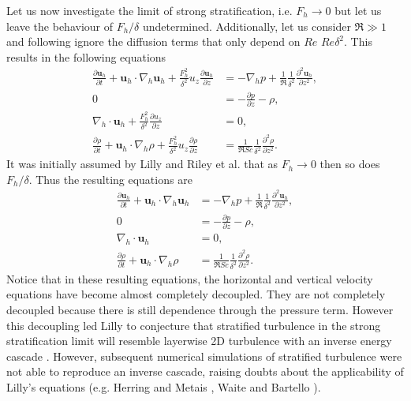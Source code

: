 Let us now investigate the limit of strong stratification, i.e. $F_{h}\rightarrow 0$ but let us leave the behaviour of $F_{h}/\delta$ undetermined. Additionally, let us consider $\Re\gg 1$ and following \cite{rileylindborg2013} ignore the diffusion terms that only depend on $Re$  $Re\delta^{2}$.  This results in the following equations 
\begin{align}
\frac{\partial \textbf{u}_{h}}{\partial t} + \textbf{u}_{h}\cdot\nabla_{h}\textbf{u}_{h}+\frac{F_{h}^{2}}{\delta^{2}}u_{z}\frac{\partial \textbf{u}_{h}}{\partial z} &= -\nabla_{h}p + \frac{1}{\Re}\frac{1}{\delta^{2}}\frac{\partial^{2}\textbf{u}_{h}}{\partial z^{2}},\\
0&= -\frac{\partial p}{\partial z} - \rho, \\
\nabla_{h}\cdot\textbf{u}_{h}+ \frac{F_{h}^{2}}{\delta^{2}}\frac{\partial u_{z}}{\partial z} &=0,\\
\frac{\partial \rho}{\partial t} + \textbf{u}_{h}\cdot\nabla_{h}\rho + \frac{F_{h}^{2}}{\delta^{2}}u_{z}\frac{\partial \rho}{\partial z} &= \frac{1}{\Re Sc}\frac{1}{\delta^{2}}\frac{\partial^{2}\rho}{\partial z^{2}} .
\end{align} 
It was initially assumed by Lilly \cite{lilly1983} and Riley et al.\cite{rileylelong2000} that as $F_{h}\rightarrow 0$ then so does $F_{h}/\delta$. Thus the resulting equations are 
\begin{align}
\frac{\partial \textbf{u}_{h}}{\partial t} + \textbf{u}_{h}\cdot\nabla_{h}\textbf{u}_{h} &= -\nabla_{h}p + \frac{1}{\Re}\frac{1}{\delta^{2}}\frac{\partial^{2}\textbf{u}_{h}}{\partial z^{2}},\\
0&= -\frac{\partial p}{\partial z} - \rho, \\
\nabla_{h}\cdot\textbf{u}_{h} &=0,\\
\frac{\partial \rho}{\partial t} + \textbf{u}_{h}\cdot\nabla_{h}\rho &= \frac{1}{\Re Sc}\frac{1}{\delta^{2}}\frac{\partial^{2}\rho}{\partial z^{2}}.
\end{align} 
Notice that in these resulting equations, the horizontal and vertical velocity equations have become almost completely decoupled. They are not completely decoupled because there is still dependence through the pressure term. However this decoupling led Lilly to conjecture that stratified turbulence in the strong stratification limit will resemble layerwise 2D turbulence with an inverse energy cascade \cite{lilly1983}. However, subsequent numerical simulations of stratified turbulence were not able to reproduce an inverse cascade, raising doubts about the applicability of Lilly's equations (e.g. Herring and Metais \cite{metais1989}, Waite and Bartello \cite{waitebartello2004}).


